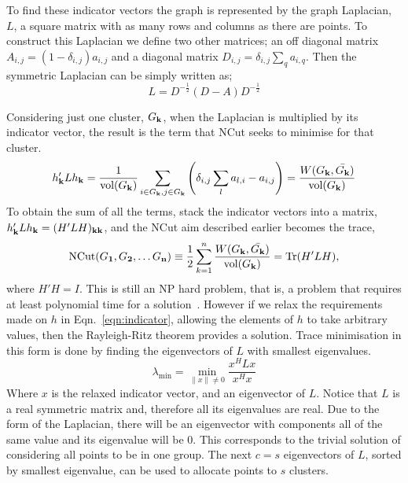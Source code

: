 To find these indicator vectors the graph is represented by the graph Laplacian, \(L\), a square
matrix with as many rows and columns as there are points.
To construct this Laplacian we define two other matrices;
an off diagonal matrix 
\(A_{i, j} = (1 - \delta_{i, j})a_{i, j}\)
and a diagonal matrix
\(D_{i, j} = \delta_{i, j}\sum_q a_{i, q}\).
Then the symmetric Laplacian can be simply written as;
\begin{equation}\label{eqn:symmetric_laplacian}
    L = D^{-\frac{1}{2}} (D - A) D^{-\frac{1}{2}}
\end{equation}

Considering just one cluster, \(G_{\textbf{k}}\), when the Laplacian is multiplied by its indicator vector,
the result is the term that NCut seeks to minimise for that cluster.
\begin{equation}
    h_{\textbf{k}}'Lh_{\textbf{k}} = \frac{1}{\text{vol}(G_{\textbf{k}})}\sum_{i \in G_{\textbf{k}}, j \in G_{\textbf{k}}} \left(\delta_{i, j}\sum_{l} a_{l, i} - a_{i, j} \right) = \frac{W(G_{\textbf{k}}, \bar{G_{\textbf{k}}})}{\text{vol}(G_{\textbf{k}})}
\end{equation}
To obtain the sum of all the terms, stack the indicator vectors into a matrix,
\( h'_{\textbf{k}} L h_{\textbf{k}} = (H'L H)_{\textbf{k}\textbf{k}}\),
and the NCut aim described earlier becomes the trace,
\begin{equation} \text{NCut}(G_{\textbf{1}},G_{\textbf{2}}, \dots G_{\textbf{n}}) \equiv \frac{1}{2} \sum_{k=1}^n \frac{W(G_{\textbf{k}}, \bar{G_{\textbf{k}}})}{\text{vol}(G_{\textbf{k}})} = \text{Tr}(H'LH),\end{equation}
where \(H'H = I\).
This is still an NP hard problem, that is, a problem that requires at least polynomial time for a solution~\cite[p. 477]{Leeuwen:1990_unfound0}.
However if we relax the requirements made on \(h\) in Eqn.~\ref{eqn:indicator},
allowing the elements of \(h\) to take arbitrary values, then the Rayleigh-Ritz theorem provides a solution.
Trace minimisation in this form is done by finding the eigenvectors of \(L\) with smallest eigenvalues.
\begin{equation}
    \lambda_\text{min} = \min_{\|x\|\ne 0 } \frac{x^H L x}{x^H x}
\end{equation}
Where \(x\) is the relaxed indicator vector, and an eigenvector of \(L\).
Notice that \(L\) is a real symmetric matrix
and, therefore all its eigenvalues are real.
Due to the form of the Laplacian, there will be an eigenvector with components all of the same value and its eigenvalue will be \(0\).
This corresponds to the trivial solution of considering all points to be in one group.
The next \(c=s\) eigenvectors of \(L\), sorted by smallest eigenvalue, can be used to allocate points to \(s\) clusters.

